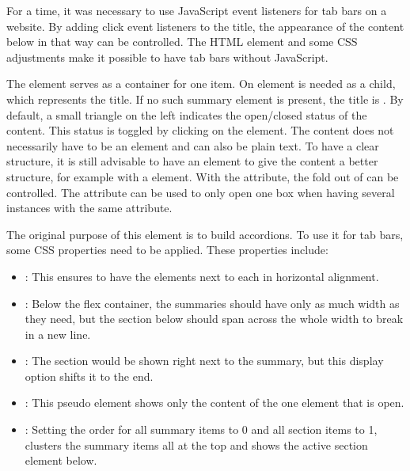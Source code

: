 For a time, it was necessary to use JavaScript event listeners for tab
bars on a website. By adding click event listeners to the title, the
appearance of the content below in that way can be controlled. The
 HTML element and some CSS adjustments make it possible
to have tab bars without JavaScript.

The  element serves as a container for one item. On
 element is needed as a child, which represents the
title. If no such summary element is present, the title is
. By default, a small triangle on the left indicates the
open/closed status of the content. This status is toggled by clicking on
the  element. The content does not necessarily have to
be an element and can also be plain text. To have a clear structure, it
is still advisable to have an element to give the content a better
structure, for example with a  element. With the
 attribute, the fold out of  can be
controlled. The  attribute can be used to only open one
 box when having several instances with the same
 attribute.

The original purpose of this element is to build accordions. To use it
for tab bars, some CSS properties need to be applied. These properties
include:
\begin{itemize}
\item {}: This ensures to have the
   elements next to each in horizontal alignment.

\item {}: Below the flex
  container, the summaries should have only as much width as they need,
  but the section below should span across the whole width to break in a
  new line.

\item {}: The section would be shown
  right next to the summary, but this display option shifts it to the
  end.

\item {}: This
  pseudo element shows only the content of the one 
  element that is open.

\item {}: Setting the order for all
  summary items to 0 and all section items to 1, clusters the summary
  items all at the top and shows the active section element below.
\end{itemize}

